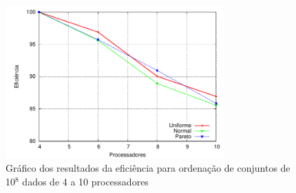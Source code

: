 \begin{figure}[htb]
\centering
\includegraphics[width=0.75\textwidth]{figuras/MaquinasEficiencia.pdf}
\caption{Gráfico dos resultados da eficiência para ordenação de conjuntos de 10$^8$ dados de 4 a 10 processadores}
\label{fig:MaquinasEficiencia}
\end{figure}

